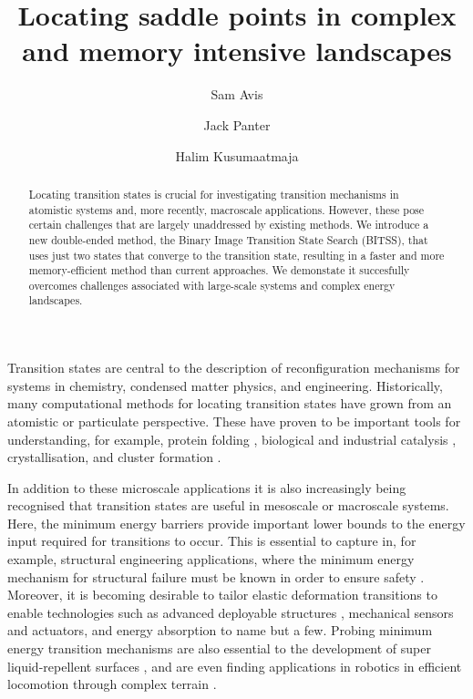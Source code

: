 \documentclass[aps,prl,twocolumn,groupedaddress]{revtex4}
\begin{document}
\title{Locating saddle points in complex and memory intensive landscapes}
\author{Sam Avis}
\author{Jack Panter}
\author{Halim Kusumaatmaja}

\begin{abstract}
  Locating transition states is crucial for investigating transition mechanisms in atomistic systems and, more recently, macroscale applications.
  However, these pose certain challenges that are largely unaddressed by existing methods.
  We introduce a new double-ended method, the Binary Image Transition State Search (BITSS), that uses just two states that converge to the transition state, resulting in a faster and more memory-efficient method than current approaches.
  We demonstate it succesfully overcomes challenges associated with large-scale systems and complex energy landscapes.
\end{abstract}

\maketitle


\topic Transition states are central to the description of reconfiguration mechanisms for systems in chemistry, condensed matter physics, and engineering.
Historically, many computational methods for locating transition states have grown from an atomistic or particulate perspective.
These have proven to be important tools for understanding, for example, protein folding \cite{Bryngelson1995,Onuchic1997}, biological and industrial catalysis \cite{Boehr2006,Kerns2015,Guo2018a}, crystallisation, and cluster formation \cite{Wales1998,Wales2012}.

\topic In addition to these microscale applications it is also increasingly being recognised that transition states are useful in mesoscale or macroscale systems.
Here, the minimum energy barriers provide important lower bounds to the energy input required for transitions to occur.
This is essential to capture in, for example, structural engineering applications, where the minimum energy mechanism for structural failure must be known in order to ensure safety \cite{Panter2019,Hutchinson2018}.
Moreover, it is becoming desirable to tailor elastic deformation transitions to enable technologies such as advanced deployable structures \cite{Filipov2015,Zhai2018}, mechanical sensors and actuators, and energy absorption \cite{Shan2015} to name but a few.
Probing minimum energy transition mechanisms are also essential to the development of super liquid-repellent surfaces \cite{Zhang2014,Panter2019b}, and are even finding applications in robotics in efficient locomotion through complex terrain \cite{Othayoth2020}.
\end{document}
